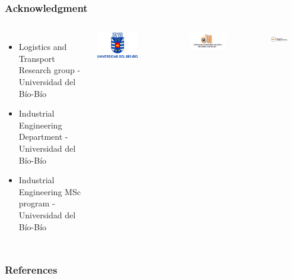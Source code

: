 \documentclass[aspectratio=169]{beamer}
\begin{document}
\begin{frame}
\frametitle{Acknowledgment}
\begin{columns}
\begin{itemize}
\item Logistics and Transport Research group - Universidad del Bío-Bío
\item Industrial Engineering Department - Universidad del Bío-Bío
\item Industrial Engineering MSc program - Universidad del Bío-Bío
\end{itemize}
\includegraphics[width=0.5\textwidth]{logos/escudo_ubb_2}

\includegraphics[width=0.5\textwidth]{logos/DII}

\includegraphics[width=0.5\textwidth]{logos/logo-mii}
\end{columns}
\end{frame}

\begin{frame}[allowframebreaks]
\frametitle{References}
\begin{tiny}
{\tiny }
\end{tiny}


\end{frame}

\frame{\titlepage}
\end{document}
